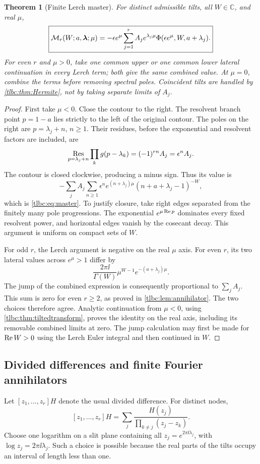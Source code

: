 \documentclass[11pt,letterpaper]{article}
\numberwithin{equation}{section}
\newtheorem{theorem}{Theorem}[section]
\theoremstyle{definition}\newtheorem{definition}[theorem]{Definition}
\theoremstyle{remark}\newtheorem{remark}[theorem]{Remark}
\newcommand{\C}{\mathbb C}\newcommand{\R}{\mathbb R}\newcommand{\Q}{\mathbb Q}\newcommand{\Z}{\mathbb Z}
\newcommand{\M}{\mathcal M}\newcommand{\T}{\mathcal T}\newcommand{\K}{\mathcal K}
\begin{document}
\begin{theorem}[Finite Lerch master]\label{tlbc:thm:master}
For distinct admissible tilts, all $W\in\C$, and real $\mu$,
\begin{equation}\label{tlbc:eq:master}
 \boxed{\displaystyle
 \M_r(W;a,\bl;\mu)
 =-\epsilon e^\mu\sum_{j=1}^r
 A_j e^{\lambda_j\mu}\Phi(\epsilon e^\mu,W,a+\lambda_j).}
\end{equation}
For even $r$ and $\mu>0$, take one common upper or one common lower lateral continuation in every Lerch term; both give the same combined value. At $\mu=0$, combine the terms before removing spectral poles. Coincident tilts are handled by \cref{tlbc:thm:Hermite}, not by taking separate limits of $A_j$.
\end{theorem}
\begin{proof}
First take $\mu<0$. Close the contour to the right. The resolvent branch point $p=1-a$ lies strictly to the left of the original contour. The poles on the right are $p=\lambda_j+n$, $n\ge1$. Their residues, before the exponential and resolvent factors are included, are
\[
 \mathop{\rm Res}_{p=\lambda_j+n}\prod_k g(p-\lambda_k)
 =(-1)^{rn}A_j=\epsilon^n A_j.
\]
The contour is closed clockwise, producing a minus sign. Thus its value is
\[
 -\sum_j A_j\sum_{n\ge1}\epsilon^n
 e^{(n+\lambda_j)\mu}(n+a+\lambda_j-1)^{-W},
\]
which is \eqref{tlbc:eq:master}. To justify closure, take right edges separated from the finitely many pole progressions. The exponential $e^{\mu\operatorname{Re} p}$ dominates every fixed resolvent power, and horizontal edges vanish by the cosecant decay. This argument is uniform on compact sets of $W$.

For odd $r$, the Lerch argument is negative on the real $\mu$ axis. For even $r$, its two lateral values across $e^\mu>1$ differ by
\[
 \frac{2\pi\ii}{\Gamma(W)}\mu^{W-1}e^{-(a+\lambda_j)\mu}.
\]
The jump of the combined expression is consequently proportional to
$\sum_j A_j$. This sum is zero for even $r\ge2$, as proved in \cref{tlbc:lem:annihilator}. The two choices therefore agree. Analytic continuation from $\mu<0$, using \cref{tlbc:thm:tiltedtransform}, proves the identity on the real axis, including its removable combined limits at zero. The jump calculation may first be made for $\operatorname{Re} W>0$ using the Lerch Euler integral and then continued in $W$.
\end{proof}

\subsection{Divided differences and finite Fourier annihilators}
Let $[z_1,\ldots,z_r]H$ denote the usual divided difference. For distinct nodes,
\[
 [z_1,\ldots,z_r]H=\sum_j\frac{H(z_j)}{\prod_{k\ne j}(z_j-z_k)}.
\]
Choose one logarithm on a slit plane containing all
$z_j=e^{2\pi\ii\lambda_j}$, with $\log z_j=2\pi\ii\lambda_j$.
Such a choice is possible because the real parts of the tilts occupy an interval of length less than one.
\end{document}

